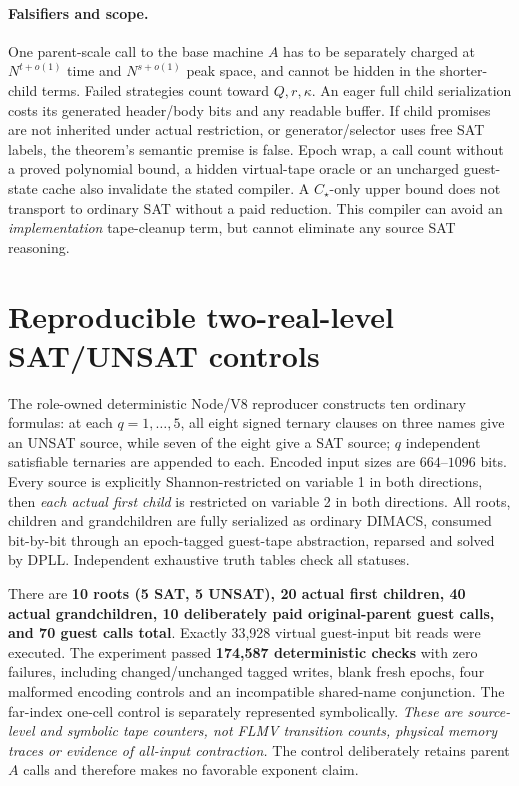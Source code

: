 \documentclass[11pt]{article}
\begin{document}
\paragraph{Falsifiers and scope.}
One parent-scale call to the base machine $A$ has to be separately charged at $N^{t+o(1)}$ time and $N^{s+o(1)}$ peak space, and cannot be hidden in the shorter-child terms. Failed strategies count toward $Q,r,\kappa$. An eager full child serialization costs its generated header/body bits and any readable buffer. If child promises are not inherited under actual restriction, or generator/selector uses free SAT labels, the theorem's semantic premise is false. Epoch wrap, a call count without a proved polynomial bound, a hidden virtual-tape oracle or an uncharged guest-state cache also invalidate the stated compiler. A $C_\star$-only upper bound does not transport to ordinary SAT without a paid reduction. This compiler can avoid an \emph{implementation} tape-cleanup term, but cannot eliminate any source SAT reasoning.

\section{Reproducible two-real-level SAT/UNSAT controls}
The role-owned deterministic Node/V8 reproducer constructs ten ordinary formulas: at each $q=1,\ldots,5$, all eight signed ternary clauses on three names give an UNSAT source, while seven of the eight give a SAT source; $q$ independent satisfiable ternaries are appended to each. Encoded input sizes are $664$--$1096$ bits. Every source is explicitly Shannon-restricted on variable 1 in both directions, then \emph{each actual first child} is restricted on variable 2 in both directions. All roots, children and grandchildren are fully serialized as ordinary DIMACS, consumed bit-by-bit through an epoch-tagged guest-tape abstraction, reparsed and solved by DPLL. Independent exhaustive truth tables check all statuses.

There are \textbf{10 roots (5 SAT, 5 UNSAT), 20 actual first children, 40 actual grandchildren, 10 deliberately paid original-parent guest calls, and 70 guest calls total}. Exactly 33,928 virtual guest-input bit reads were executed. The experiment passed \textbf{174,587 deterministic checks} with zero failures, including changed/unchanged tagged writes, blank fresh epochs, four malformed encoding controls and an incompatible shared-name conjunction. The far-index one-cell control is separately represented symbolically. \emph{These are source-level and symbolic tape counters, not FLMV transition counts, physical memory traces or evidence of all-input contraction.} The control deliberately retains parent $A$ calls and therefore makes no favorable exponent claim.
\end{document}
